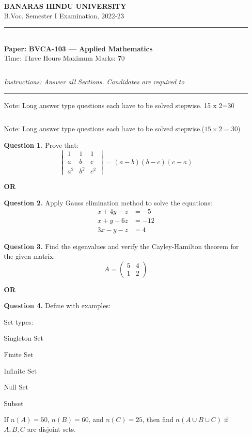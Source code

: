 \documentclass[11pt,a4paper]{article}
\begin{document}
\begin{center}
  {\large\bfseries BANARAS HINDU UNIVERSITY}\\[2pt]
  {\normalsize B.Voc. Semester I Examination, 2022-23}\\[6pt]
  \rule{0.8\linewidth}{0.5pt}\\[6pt]
  {\large\bfseries Paper: BVCA-103 --- Applied Mathematics}\\[4pt]
  {\normalsize Time: Three Hours \hfill Maximum Marks: 70}
\end{center}

\rule{\linewidth}{0.4pt}

\smallskip
\noindent\textit{Instructions: Answer all Sections. Candidates are required to}

\bigskip

\smallskip

\bigskip{}
\rule{\linewidth}{0.4pt}\smallskip

Note: Long answer type questions each have to be solved
stepwise. 15 x 2=30

\bigskip{}
\rule{\linewidth}{0.4pt}\smallskip

Note: Long answer type questions each have to be solved stepwise.\hfill ($15 \times 2 = 30$)

\medskip\noindent\textbf{Question 1.} Prove that:
\[
\begin{vmatrix}
  1 & 1 & 1 \\
  a & b & c \\
  a^2 & b^2 & c^2
\end{vmatrix} = (a-b)(b-c)(c-a)
\]
\centerline{\textbf{OR}}

\medskip\noindent\textbf{Question 2.} Apply Gauss elimination method to solve the equations:
\[
\begin{aligned}
  x + 4y - z &= -5 \\
  x + y - 6z &= -12 \\
  3x - y - z &= 4
\end{aligned}
\]

\medskip\noindent\textbf{Question 3.} Find the eigenvalues and verify the Cayley-Hamilton theorem for the given matrix:
\[
A = \begin{pmatrix}
  5 & 4 \\
  1 & 2
\end{pmatrix}
\]
\centerline{\textbf{OR}}

\medskip\noindent\textbf{Question 4.} Define with examples:
\begin{parts}
  \item Set types:
  \begin{parts}
    \item Singleton Set
    \item Finite Set
    \item Infinite Set
    \item Null Set
    \item Subset
  \end{parts}
  \item If $n(A) = 50$, $n(B) = 60$, and $n(C) = 25$, then find $n(A \cup B \cup C)$ if $A, B, C$ are disjoint sets.
\end{parts}
\end{document}
